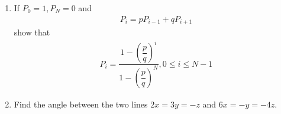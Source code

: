 \documentclass[journal,12pt,onecolumn]{IEEEtran}
\renewcommand\thesection{\arabic{section}}
\theoremstyle{remark}
\numberwithin{equation}{section}
\begin{document}
\begin{enumerate}[label=\arabic*.,ref=\thesection.\theenumi]
\item If $P_0 =1, P_N = 0$ and
\begin{align}
P_i = p P_{i-1}+qP_{i+1}
\end{align}
	show that 
\begin{align}
	P_i =	\dfrac{1-\left(\dfrac{p}{q}\right)^i}{1-\left(\dfrac{p}{q}\right)^N}, 0\leq i\leq N-1
\end{align}
\item Find the angle between the two lines $2x = 3y = -z$ and $6x = -y = -4z$.

\end{enumerate}
\end{document}
